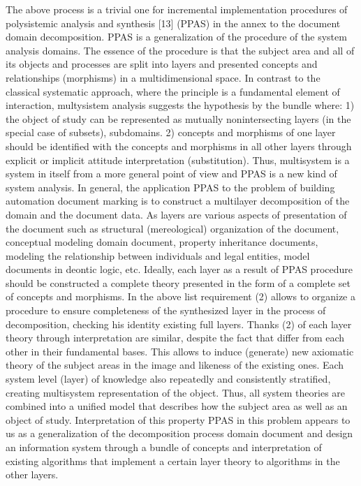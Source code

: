\documentclass[conference]{IEEEtran}
\begin{document}

The above process is a trivial one for incremental implementation procedures of polysistemic analysis and synthesis [13] (PPAS) in the annex to the document domain decomposition. PPAS is a generalization of the procedure of the system analysis domains. The essence of the procedure is that the subject area and all of its objects and processes are split into layers and presented concepts and relationships (morphisms) in a multidimensional space. In contrast to the classical systematic approach, where the principle is a fundamental element of interaction, multysistem analysis suggests the hypothesis by the bundle where:
1) the object of study can be represented as mutually nonintersecting layers (in the special case of subsets), subdomains.
2) concepts and morphisms of one layer should be identified with the concepts and morphisms in all other layers through explicit or implicit attitude interpretation (substitution).
Thus, multisystem is a system in itself from a more general point of view and PPAS is a new kind of system analysis.
	In general, the application PPAS to the problem of building automation document marking is to construct a multilayer decomposition of the domain and the document data. As layers are various aspects of presentation of the document such as structural (mereological) organization of the document, conceptual modeling domain document, property inheritance documents, modeling the relationship between individuals and legal entities, model documents in deontic logic, etc. Ideally, each layer as a result of PPAS procedure should be constructed a complete theory presented in the form of a complete set of concepts and morphisms. In the above list requirement (2) allows  to organize a procedure to ensure completeness of the synthesized layer in the process of decomposition, checking his identity existing full layers.
	Thanks (2) of each layer theory through interpretation are similar, despite the fact that differ from each other in their fundamental bases. This allows to induce (generate) new axiomatic theory of the subject areas in the image and likeness of the existing ones. Each system level (layer) of knowledge also repeatedly and consistently stratified, creating multisystem representation of the object. Thus, all system theories are combined into a unified model that describes how the subject area as well as an object of study. Interpretation of this property PPAS in this problem appears to us as a generalization of the decomposition process domain document and design an information system through a bundle of concepts and interpretation of existing algorithms that implement a certain layer theory to algorithms in the other layers.
\end{document}
